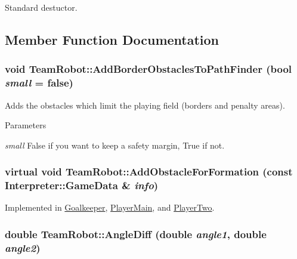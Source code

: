 Standard destuctor. 



\subsection{Member Function Documentation}
\hypertarget{classTeamRobot_acf4c435c98bc406744a12cd140d6631d}{
\subsubsection[{AddBorderObstaclesToPathFinder}]{\setlength{\rightskip}{0pt plus 5cm}void TeamRobot::AddBorderObstaclesToPathFinder (bool {\em small} = {\ttfamily false})}}
\label{classTeamRobot_acf4c435c98bc406744a12cd140d6631d}


Adds the obstacles which limit the playing field (borders and penalty areas). 


\begin{DoxyParams}{Parameters}
\item[{\em small}]False if you want to keep a safety margin, True if not. \end{DoxyParams}
\hypertarget{classTeamRobot_a71ec65db46db1ac511fe17b668d4f192}{
\subsubsection[{AddObstacleForFormation}]{\setlength{\rightskip}{0pt plus 5cm}virtual void TeamRobot::AddObstacleForFormation (const {\bf Interpreter::GameData} \& {\em info})}}
\label{classTeamRobot_a71ec65db46db1ac511fe17b668d4f192}


Implemented in \hyperlink{classGoalkeeper_a5287a2e74795bbec8f0ead767655da5d}{Goalkeeper}, \hyperlink{classPlayerMain_a978b3ce16f5d8e5d1cb9ef70f387227e}{PlayerMain}, and \hyperlink{classPlayerTwo_a9e3341541658f54a2dfb0491a774b4d4}{PlayerTwo}.

\hypertarget{classTeamRobot_a45d5d631b1e1e28c9c0f4ecbd47fdbde}{
\subsubsection[{AngleDiff}]{\setlength{\rightskip}{0pt plus 5cm}double TeamRobot::AngleDiff (double {\em angle1}, \/  double {\em angle2})}}
\label{classTeamRobot_a45d5d631b1e1e28c9c0f4ecbd47fdbde}


